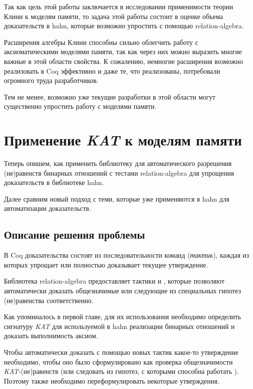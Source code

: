 \documentclass[times
              ]{itmo-student-thesis}
\begin{document}
    Так как цель этой работы заключается в исследовании применимости теории Клини к моделям памяти,
    то задача этой работы состоит в оценке объема доказательств в hahn, которые возможно упростить с помощью relation-algebra.


  \chapterconclusion
    Расширения алгебры Клини способны сильно облегчить работу с аксиоматическими моделями памяти,
    так как через них можно выразить многие важные в этой области свойства. К сожалению, немногие
    расширения возможно реализовать в Coq эффективно и даже те, что реализованы, потребовали огромного труда разработчиков.

    Тем не менее, возможно уже текущие разработки в этой области могут существенно упростить работу с моделями памяти.

\chapter{Применение \textit{KAT} к моделям памяти}

  Теперь опишем, как применить библиотеку для автоматического разрешения (не)равенств бинарных
  отношений с тестами relation-algebra для упрощения доказательств в библиотеке hahn.

  Далее сравним новый подход с теми, которые уже применяются в hahn для автоматизации доказательств.

  \section{Описание решения проблемы}

    В Coq доказательства состоят из последовательности команд (\textit{тактик}), каждая из
    которых упрощает или полностью доказывает текущее утверждение.

    Библиотека relation-algebra предоставляет тактики  и ,
    которые позволяют автоматически доказать общезначимые или следующие из специальных гипотез
    (не)равенства соответственно.

    Как упоминалось в первой главе, для их использования необходимо определить сигнатуру \textit{KAT} для
    используемой в hahn реализации бинарных отношений и доказать выполнимость аксиом.

    Чтобы автоматически доказать с помощью новых тактик какое-то утверждение необходимо, чтобы оно было
    сформулировано как проверка общезначимости \textit{KAT}-(не)равенств (или следовать из гипотез, с которыми
    способна работать ).
    Поэтому также необходимо переформулировать некоторые утверждения.
\end{document}
